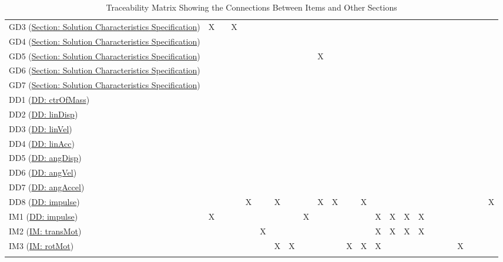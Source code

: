 \documentclass[12pt]{article}
\begin{document}
\begin{longtable}{l l l l l l l l l l l l l l l l l l l l l l l l}
\\
GD3 (\hyperref[Sec:SolCharSpec]{Section: Solution Characteristics Specification}) & X &  & X &  &  &  &  &  &  &  &  &  &  &  &  &  &  &  &  &  &  &  & 
\\
GD4 (\hyperref[Sec:SolCharSpec]{Section: Solution Characteristics Specification}) &  &  &  &  &  &  &  &  &  &  &  &  &  &  &  &  &  &  &  &  &  &  & 
\\
GD5 (\hyperref[Sec:SolCharSpec]{Section: Solution Characteristics Specification}) &  &  &  &  &  &  &  &  & X &  &  &  &  &  &  &  &  &  &  &  &  &  & 
\\
GD6 (\hyperref[Sec:SolCharSpec]{Section: Solution Characteristics Specification}) &  &  &  &  &  &  &  &  &  &  &  &  &  &  &  &  &  &  &  &  &  &  & 
\\
GD7 (\hyperref[Sec:SolCharSpec]{Section: Solution Characteristics Specification}) &  &  &  &  &  &  &  &  &  &  &  &  &  &  &  &  &  &  &  &  &  &  & 
\\
DD1 (\hyperref[DD:ctrOfMass]{DD: ctrOfMass}) &  &  &  &  &  &  &  &  &  &  &  &  &  &  &  &  &  &  &  &  &  &  & 
\\
DD2 (\hyperref[DD:linDisp]{DD: linDisp}) &  &  &  &  &  &  &  &  &  &  &  &  &  &  &  &  &  &  &  &  &  &  & 
\\
DD3 (\hyperref[DD:linVel]{DD: linVel}) &  &  &  &  &  &  &  &  &  &  &  &  &  &  &  &  &  &  &  &  &  &  & 
\\
DD4 (\hyperref[DD:linAcc]{DD: linAcc}) &  &  &  &  &  &  &  &  &  &  &  &  &  &  &  &  &  &  &  &  &  &  & 
\\
DD5 (\hyperref[DD:angDisp]{DD: angDisp}) &  &  &  &  &  &  &  &  &  &  &  &  &  &  &  &  &  &  &  &  &  &  & 
\\
DD6 (\hyperref[DD:angVel]{DD: angVel}) &  &  &  &  &  &  &  &  &  &  &  &  &  &  &  &  &  &  &  &  &  &  & 
\\
DD7 (\hyperref[DD:angAccel]{DD: angAccel}) &  &  &  &  &  &  &  &  &  &  &  &  &  &  &  &  &  &  &  &  &  &  & 
\\
DD8 (\hyperref[DD:impulse]{DD: impulse}) &  &  &  & X &  & X &  &  & X & X &  & X &  &  &  &  &  &  &  &  &  &  & X
\\
IM1 (\hyperref[DD:impulse]{DD: impulse}) & X &  &  &  &  &  &  & X &  &  &  &  & X & X & X & X &  &  &  &  &  &  & 
\\
IM2 (\hyperref[IM:transMot]{IM: transMot}) &  &  &  &  & X &  &  &  &  &  &  &  & X & X & X & X &  &  &  &  &  &  & 
\\
IM3 (\hyperref[IM:rotMot]{IM: rotMot}) &  &  &  &  &  & X & X &  &  &  & X & X & X &  &  &  &  &  &  & X &  &  & 
\\
\bottomrule
\caption{Traceability Matrix Showing the Connections Between Items and Other Sections}
\label{Table:TraceyItemsSecs}
\end{longtable}
\end{document}
